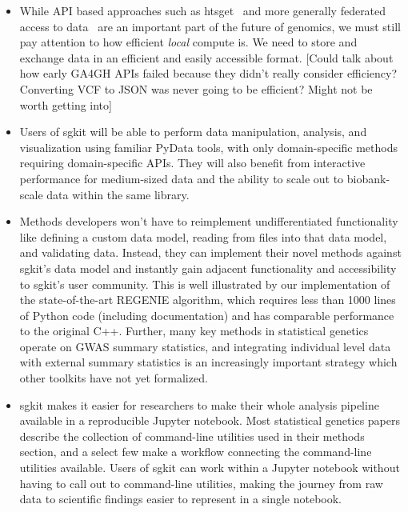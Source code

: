 \documentclass[9pt,lineno]{elife}
\begin{document}
\begin{itemize}

\item While API based approaches such as htsget~\citep{kelleher2019htsget}
and more generally federated access to data~\citep{rehm2021ga4gh}
are an important part of the future of genomics, we must still pay
attention to how efficient \emph{local} compute is. We need to
store and exchange data in an efficient and easily accessible
format. [Could talk about
how early GA4GH APIs failed because they didn't really consider
efficiency? Converting VCF to JSON was never going to be efficient?
Might not be worth getting into]

\item Users of sgkit will be able to perform data manipulation, analysis, and
visualization using familiar PyData tools, with only domain-specific methods
requiring domain-specific APIs. They will also benefit from interactive
performance for medium-sized data and the ability to scale out to biobank-scale
data within the same library. 

\item
Methods developers won’t have to reimplement undifferentiated functionality
like defining a custom data model, reading from files into that data model, and
validating data. Instead, they can implement their novel methods against
sgkit’s data model and instantly gain adjacent functionality and accessibility
to sgkit’s user community. This is well illustrated by our implementation of
the state-of-the-art REGENIE algorithm, which requires less than 1000 lines of
Python code (including documentation) and has comparable performance to the
original C++. Further, many key methods in statistical genetics operate on GWAS
summary statistics, and integrating individual level data with external summary
statistics is an increasingly important strategy which other toolkits have not
yet formalized.

\item sgkit makes it easier for researchers to
make their whole analysis pipeline available in a reproducible Jupyter
notebook. Most statistical genetics papers describe the collection of
command-line utilities used in their methods section, and a select few make a
workflow connecting the command-line utilities available. Users of sgkit can
work within a Jupyter notebook without having to call out to command-line
utilities, making the journey from raw data to scientific findings easier to
represent in a single notebook.

\end{itemize}
\end{document}
